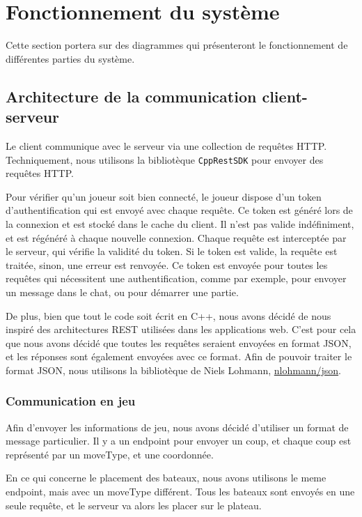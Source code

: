 \documentclass[../design_fonctionnement_sys.tex]{subfiles}
\begin{document}
\section{Fonctionnement du système}
Cette section portera sur des diagrammes qui présenteront le fonctionnement de différentes parties du système.

\subsection{Architecture de la communication client-serveur}
Le client communique avec le serveur via une collection de requêtes HTTP. Techniquement, nous utilisons la bibliotèque \texttt{CppRestSDK} pour envoyer des requêtes HTTP.

Pour vérifier qu'un joueur soit bien connecté, le joueur dispose d'un token d'authentification qui est envoyé avec chaque requête.
Ce token est généré lors de la connexion et est stocké dans le cache du client. Il n'est pas valide indéfiniment, et est régénéré à chaque nouvelle connexion.
Chaque requête est interceptée par le serveur, qui vérifie la validité du token. Si le token est valide, la requête est traitée, sinon, une erreur est renvoyée.
Ce token est envoyée pour toutes les requêtes qui nécessitent une authentification, comme par exemple, pour envoyer un message dans le chat, ou pour démarrer une partie.

De plus, bien que tout le code soit écrit en C++, nous avons décidé de nous inspiré des architectures REST utilisées dans les applications web.
C'est pour cela que nous avons décidé que toutes les requêtes seraient envoyées en format JSON, et les réponses sont également envoyées avec ce format.
Afin de pouvoir traiter le format JSON, nous utilisons la bibliotèque de Niels Lohmann, \href{https://github.com/nlohmann/json}{nlohmann/json}.

\subsubsection*{Communication en jeu}
Afin d'envoyer les informations de jeu, nous avons décidé d'utiliser un format de message particulier.
Il y a un endpoint pour envoyer un coup, et chaque coup est représenté par un moveType, et une coordonnée.

En ce qui concerne le placement des bateaux, nous avons utilisons le meme endpoint, mais avec un moveType différent.
Tous les bateaux sont envoyés en une seule requête, et le serveur va alors les placer sur le plateau.
\end{document}
